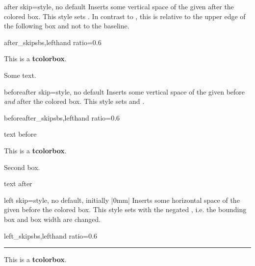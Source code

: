\begin{docTcbKey}[][doc new and updated={2020-09-25}{2017-02-01}]{after skip}{=}{style, no default}
  Inserts some vertical space of the given  after the colored box.
  This style sets .
  In contrast to , this  is
  relative to the upper edge of the following box and not to the baseline.
\begin{exdispExample*}{after_skip}{sbs,lefthand ratio=0.6}
\begin{tcolorbox}[after skip=1cm,
    colframe=red!50!white]
  This is a \textbf{tcolorbox}.
\end{tcolorbox}
Some text.
\end{exdispExample*}
\end{docTcbKey}

\begin{docTcbKey}[][doc new=2014-10-10]{beforeafter skip}{=}{style, no default}
  Inserts some vertical space of the given  before \emph{and} after the colored box.
  This style sets  and .
\begin{exdispExample*}{beforeafter_skip}{sbs,lefthand ratio=0.6}

text before
\begin{tcolorbox}
  This is a \textbf{tcolorbox}.
\end{tcolorbox}
\begin{tcolorbox}
  Second box.
\end{tcolorbox}
text after
\end{exdispExample*}
\end{docTcbKey}


\clearpage

\begin{docTcbKey}[][doc new=2014-11-07]{left skip}{=}{style, no default, initially |0mm|}
  Inserts some horizontal space of the given  before the colored box.
  This style sets  with the negated ,
  i.e. the bounding box and box width are changed.
\begin{exdispExample*}{left_skip}{sbs,lefthand ratio=0.6}
\noindent\rule{\linewidth}{2pt}

\begin{tcolorbox}[left skip=1cm,
    colframe=red!50!white]
  This is a \textbf{tcolorbox}.
\end{tcolorbox}
\end{exdispExample*}
\end{docTcbKey}

